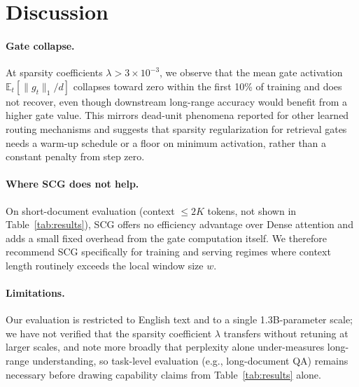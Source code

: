 \section{Discussion}
\label{sec:discussion}

\paragraph{Gate collapse.} At sparsity coefficients $\lambda > 3\times
10^{-3}$, we observe that the mean gate activation $\mathbb{E}_t[\|g_t\|_1/d]$
collapses toward zero within the first 10\% of training and does not
recover, even though downstream long-range accuracy would benefit from a
higher gate value. This mirrors dead-unit phenomena reported for other
learned routing mechanisms \cite{winslow2022scaling} and suggests that
sparsity regularization for retrieval gates needs a warm-up schedule or a
floor on minimum activation, rather than a constant penalty from step zero.

\paragraph{Where SCG does not help.} On short-document evaluation (context
$\le 2K$ tokens, not shown in Table~\ref{tab:results}), SCG offers no
efficiency advantage over Dense attention and adds a small fixed overhead
from the gate computation itself. We therefore recommend SCG specifically
for training and serving regimes where context length routinely exceeds the
local window size $w$.

\paragraph{Limitations.} Our evaluation is restricted to English text and to
a single 1.3B-parameter scale; we have not verified that the sparsity
coefficient $\lambda$ transfers without retuning at larger scales, and
\cite{delgado2020perplexity} note more broadly that perplexity alone
under-measures long-range understanding, so task-level evaluation (e.g.,
long-document QA) remains necessary before drawing capability claims from
Table~\ref{tab:results} alone.
